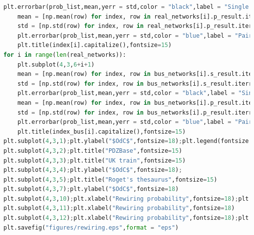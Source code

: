 \documentclass[12pt]{article}
\begin{document}
\begin{lstlisting}[breaklines=true,language=Python]
    plt.errorbar(prob_list,mean,yerr = std,color = "black",label = "Single link rewiring")
    mean = [np.mean(row) for index, row in real_networks[i].p_result.iterrows()]
    std = [np.std(row) for index, row in real_networks[i].p_result.iterrows()]
    plt.errorbar(prob_list,mean,yerr = std,color = "blue",label = "Pairwise rewiring")
    plt.title(index[i].capitalize(),fontsize=15)
for i in range(len(real_networks)):
    plt.subplot(4,3,6+i+1)
    mean = [np.mean(row) for index, row in bus_networks[i].s_result.iterrows()]
    std = [np.std(row) for index, row in bus_networks[i].s_result.iterrows()]
    plt.errorbar(prob_list,mean,yerr = std,color = "black",label = "Single link rewiring")
    mean = [np.mean(row) for index, row in bus_networks[i].p_result.iterrows()]
    std = [np.std(row) for index, row in bus_networks[i].p_result.iterrows()]
    plt.errorbar(prob_list,mean,yerr = std,color = "blue",label = "Pairwise rewiring")
    plt.title(index_bus[i].capitalize(),fontsize=15)
plt.subplot(4,3,1);plt.ylabel("$OdC$",fontsize=18);plt.legend(fontsize = 12);plt.title("Dolphins",fontsize=15)
plt.subplot(4,3,2);plt.title("PDZBase",fontsize=15)
plt.subplot(4,3,3);plt.title("UK train",fontsize=15)
plt.subplot(4,3,4);plt.ylabel("$OdC$",fontsize=18);
plt.subplot(4,3,5);plt.title("Roget's thesaurus",fontsize=15)
plt.subplot(4,3,7);plt.ylabel("$OdC$",fontsize=18)
plt.subplot(4,3,10);plt.xlabel("Rewiring probability",fontsize=18);plt.ylabel("$OdC$",fontsize=18)
plt.subplot(4,3,11);plt.xlabel("Rewiring probability",fontsize=18)
plt.subplot(4,3,12);plt.xlabel("Rewiring probability",fontsize=18);plt.legend(fontsize = 12)
plt.savefig("figures/rewiring.eps",format = "eps")
\end{lstlisting}
\end{document}
